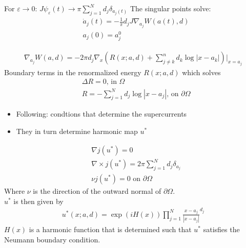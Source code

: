 \documentclass[12pt, a4paper]{article}
\theoremstyle{plain}
\theoremstyle{definition}
\newcommand{\psieps}{\psi_\varepsilon}
\begin{document}
For $\varepsilon \to 0$:
$J \psieps (t) \to \pi \sum^N_{j=1} d_j \delta_{a_j (t)}$
The singular points solve:
\begin{align}
  &\dot a_j (t) = - \frac{1}{\pi} d_j J \nabla_{a_j} W(a(t), d) \\
  &a_j(0) = a^0_j
\end{align}

\begin{align}
    \nabla_{a_j} W(a,d) = - 2\pi d_j \nabla_x (R(x; a,d) + \sum^n_{j\neq k} d_k \log |x-a_k|)\vert_{x=a_j}
\end{align}
Boundary terms in the renormalized energy $R(x; a,d)$ which solves
\begin{align}
  &\Delta R = 0 \text{, in } \Omega \\
  &R = - \sum^N_{j=1} d_j \log |x-a_j| \text{, on } \partial \Omega
\end{align}

\begin{itemize}
    \item Following: condtions that determine the supercurrents
    \item They in turn determine harmonic map $u^*$
\end{itemize}
\begin{align}
  &\nabla j(u^*) =0\\
  &\nabla \times j(u^*) = 2\pi \sum^N_{j=1} d_j \delta_{a_j} \\
  &\nu j(u^*) =0 \text{ on } \partial \Omega
\end{align}
Where $\nu$ is the direction of the outward normal of $\partial \Omega$.\\ 
$u^*$ is then given by
\begin{align}
  u^* (x; a,d) = \exp (i H(x)) \prod^N_{j=1} \frac{x-a_j}{|x-a_j|}^{d_j}
\end{align}
$H(x)$ is a harmonic function that is determined such that $u^*$ satisfies the Neumann boundary condition.
\end{document}
